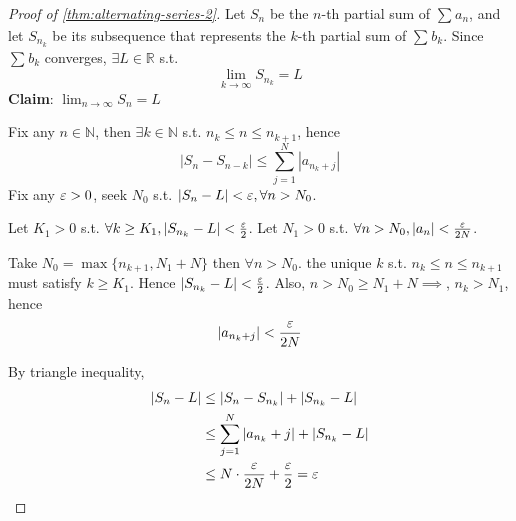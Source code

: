 \begin{proof}[Proof of \ref{thm:alternating-series-2}]
    Let $S_n$ be the $n$-th partial sum of $\sum\limits_{}^{} a_n$,
    and let $S_{n_k}$ be its subsequence that represents 
    the $k$-th partial sum of $\sum\limits_{}^{} b_k$. 
    Since $\sum\limits_{}^{} b_k$ converges, $\exists L \in \mathbb{R}$
    s.t. 
    \[
        \lim_{k \to \infty} S_{n_k} = L
    \]
    \textbf{Claim}: $\lim_{n \to \infty}S_n = L$ 
    \medskip

    Fix any $n \in \mathbb{N}$, then $\exists k \in \mathbb{N} $
    s.t. $n_k \leq n \leq n_{k + 1}$, hence
    \[
        \left| S_n - S_{n - k} \right| 
        \leq 
        \sum\limits_{j = 1}^{N}  \left| a_{n_{k} + j} \right| 
    \]
    Fix any $\varepsilon > 0$, seek $N_0$ s.t. 
    $ \left| S_n - L \right|  < \varepsilon, \forall n > N_0$.
    \medskip

    Let $K_1 > 0$ s.t. $\forall k \geq K_1, \left| S_{n_k} - L \right| < \frac{\varepsilon}{2} $.
    Let $N_1 > 0$ s.t. $ \forall n > N_0, \left| a_n \right| < \frac{\varepsilon}{2N}$.
    \medskip

    Take $N_0 = \max \{ n_{k+1}, N_1 + N \} $
    then $\forall n > N_0$.
    the unique $k$ s.t. $n_k \leq n \leq n_{k + 1}$
    must satisfy $k \geq K_1$.
    Hence $ \left| S_{n_k} - L\right|  < \frac{\varepsilon}{2}$.
    Also, $n > N_0 \geq N_1 + N \implies$,
    $n_k > N_1$, hence 
    \[
        \left| a_{n_k + j} \right| < \frac{\varepsilon}{2N}
    \]

    By triangle inequality,
    \begin{align*}
        \left| S_n - L \right|  & \leq 
        \left| S_n - S_{n_k} \right|  + \left| S_{n_k} - L\right|  \\
        & \leq \sum\limits_{j=1}^{N} |a_{n_k} + j| + |S_{n_k} - L| \\
        & \leq N \cdot \frac{\varepsilon}{2N} + \frac{\varepsilon}{2} = \varepsilon
    \end{align*}
    
\end{proof}
